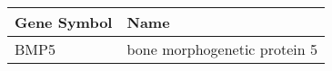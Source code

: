 \begin{tabular}{ll}
\toprule
Gene Symbol &                         Name \\
\midrule
       BMP5 & bone morphogenetic protein 5 \\
\bottomrule
\end{tabular}
